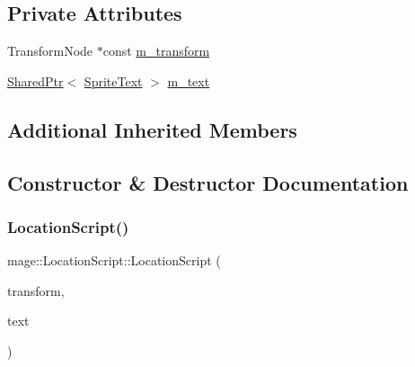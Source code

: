 \subsection*{Private Attributes}
\begin{DoxyCompactItemize}
\item 
Transform\+Node $\ast$const \hyperlink{classmage_1_1_location_script_a6e4ed33a4d2031c8726731c64b8200c9}{m\+\_\+transform}
\item 
\hyperlink{namespacemage_a1e01ae66713838a7a67d30e44c67703e}{Shared\+Ptr}$<$ \hyperlink{classmage_1_1_sprite_text}{Sprite\+Text} $>$ \hyperlink{classmage_1_1_location_script_ac5c7ada3b364d85888686abf20cd6463}{m\+\_\+text}
\end{DoxyCompactItemize}
\subsection*{Additional Inherited Members}


\subsection{Constructor \& Destructor Documentation}
\hypertarget{classmage_1_1_location_script_a14bc9a5868daff6401b0c8b4feebbb3e}{}\label{classmage_1_1_location_script_a14bc9a5868daff6401b0c8b4feebbb3e} 
\subsubsection{\texorpdfstring{Location\+Script()}{LocationScript()}\hspace{0.1cm}{\footnotesize\ttfamily [1/3]}}
{\footnotesize\ttfamily mage\+::\+Location\+Script\+::\+Location\+Script (\begin{DoxyParamCaption}\item[{Transform\+Node $\ast$}]{transform,  }\item[{\hyperlink{namespacemage_a1e01ae66713838a7a67d30e44c67703e}{Shared\+Ptr}$<$ \hyperlink{classmage_1_1_sprite_text}{Sprite\+Text} $>$}]{text }\end{DoxyParamCaption})\hspace{0.3cm}{\ttfamily [explicit]}}

\hypertarget{classmage_1_1_location_script_a53fb0562896eadb4c747d53b53f65b40}{}\label{classmage_1_1_location_script_a53fb0562896eadb4c747d53b53f65b40} 
